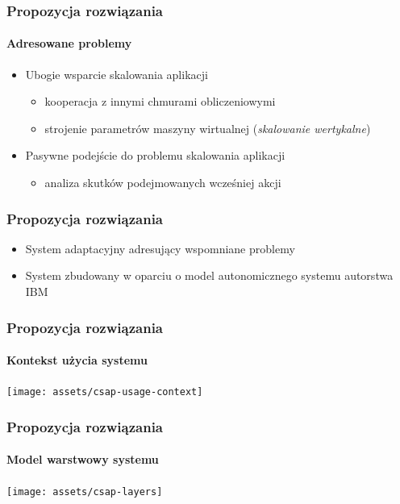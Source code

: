 \documentclass{beamer}
\begin{document}
\begin{frame}
\frametitle{Propozycja rozwiązania}
\framesubtitle{Adresowane problemy}

\begin{itemize}

\item Ubogie wsparcie skalowania aplikacji
		\begin{itemize}
			\item kooperacja z innymi chmurami obliczeniowymi
      \item strojenie parametrów maszyny wirtualnej (\textit{skalowanie wertykalne})
		\end{itemize}

\item Pasywne podejście do problemu skalowania aplikacji 
		\begin{itemize}
			\item analiza skutków podejmowanych wcześniej akcji
		\end{itemize}		
\end{itemize}
\end{frame}




\begin{frame}
\frametitle{Propozycja rozwiązania}

\begin{itemize}
	\item System adaptacyjny adresujący wspomniane problemy
	\item System zbudowany w oparciu o model autonomicznego systemu autorstwa IBM
\end{itemize}


\end{frame}





\begin{frame}
\frametitle{Propozycja rozwiązania}
\framesubtitle{Kontekst użycia systemu}
\vspace{2 mm}
\begin{center}

\texttt{[image: assets/csap-usage-context]}
\end{center}

\end{frame}



\begin{frame}
\frametitle{Propozycja rozwiązania}
\framesubtitle{Model warstwowy systemu}
\vspace{2 mm}
\begin{center}
\texttt{[image: assets/csap-layers]}
\end{center}
\end{frame}
\end{document}

